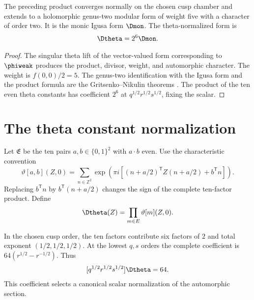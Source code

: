 \begin{theorem}
The preceding product converges normally on the chosen cusp chamber and extends to a holomorphic genus-two modular form of weight five with a character of order two. It is the monic Igusa form $\Dmon$. The theta-normalized form is
\[
 \Dtheta=2^6\Dmon.
\]
\end{theorem}
\begin{proof}
The singular theta lift of the vector-valued form corresponding to $\phiweak$ produces the product, divisor, weight, and automorphic character. The weight is $f(0,0)/2=5$. The genus-two identification with the Igusa form and the product formula are the Gritsenko--Nikulin theorems \cite{Borcherds95,Borcherds98,GN97,GN98b}. The product of the ten even theta constants has coefficient $2^6$ at $q^{1/2}r^{1/2}s^{1/2}$, fixing the scalar.
\end{proof}

\section{The theta constant normalization}
Let $\mathfrak E$ be the ten pairs $a,b\in\{0,1\}^2$ with $a\cdot b$ even.
Use the characteristic convention
\[
 \vartheta[a,b](Z,0)=\sum_{n\in\mathbb Z^2}
 \exp\!\left(\pi i\left[(n+a/2)^{\mathsf T}Z(n+a/2)+b^{\mathsf T}n\right]\right).
\]
Replacing $b^{\mathsf T}n$ by $b^{\mathsf T}(n+a/2)$ changes the sign of the complete ten-factor product.
Define
\[
 \Dtheta(Z)=\prod_{\mathfrak m\in\mathfrak E}\vartheta[\mathfrak m](Z,0).
\]

In the chosen cusp order, the ten factors contribute six factors of $2$ and total exponent $(1/2,1/2,1/2)$. At the lowest $q,s$ orders the complete coefficient is $64(r^{1/2}-r^{-1/2})$. Thus
\[
 [q^{1/2}r^{1/2}s^{1/2}]\Dtheta=64.
\]
This coefficient selects a canonical scalar normalization of the automorphic section.


